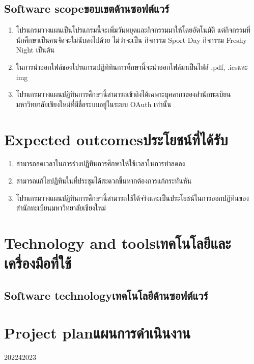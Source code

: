 \subsection{\ifenglish Software scope\else ขอบเขตด้านซอฟต์แวร์\fi}
\begin{enumerate}
\item โปรแกรมวางแผนเป็นโปรแกรมนี้จะเพิ่มวันหยุดและกิจกรรมมาให้โดยอัตโนมัติ แต่กิจกรรมที่นักศึกษาเป็นคนจัดจะไม่นับลงไปด้วย ไม่ว่าจะเป็น กิจกรรม Sport Day กิจกรรม Freshy Night เป็นต้น
\item ในการนำออกไฟล์ของโปรแกรมปฏิทิทินการศึกษานี้จะนำออกไฟล์มาเป็นไฟล์ .pdf, .icsและ img 
\item โปรแกรมวางแผนปฏิทินการศึกษานี้สามารถเข้าถึงได้เฉพาะบุคลากรของสำนักทะเบียนมหาวิทยาลัยเชียงใหม่ที่มีชื่อระบบอยู่ในระบบ OAuth เท่านั้น   
\end{enumerate}

\section{\ifenglish Expected outcomes\else ประโยชน์ที่ได้รับ\fi}
\begin{enumerate}
\item สามารถลดเวลาในการร่างปฏิทินการศึกษาให้ใช้เวลาในการทำลดลง
\item สามารถแก้ไขปฏิทินในที่ประชุมได้สะดวกขึ้นหากต้องการแก้กระทันหัน
\item โปรแกรมวางแผนปฏิทินการศึกษานี้สามารถใช้ได้จริงและเป็นประโยชน์ในการออกปฏิทินของสำนักทะเบียนมหาวิทยาลัยเชียงใหม่
\end{enumerate}
\section{\ifenglish Technology and tools\else เทคโนโลยีและเครื่องมือที่ใช้\fi}


\subsection{\ifenglish Software technology\else เทคโนโลยีด้านซอฟต์แวร์\fi}

\section{\ifenglish Project plan\else แผนการดำเนินงาน\fi}

\begin{plan}{1}{2022}{4}{2023}
\end{plan}

